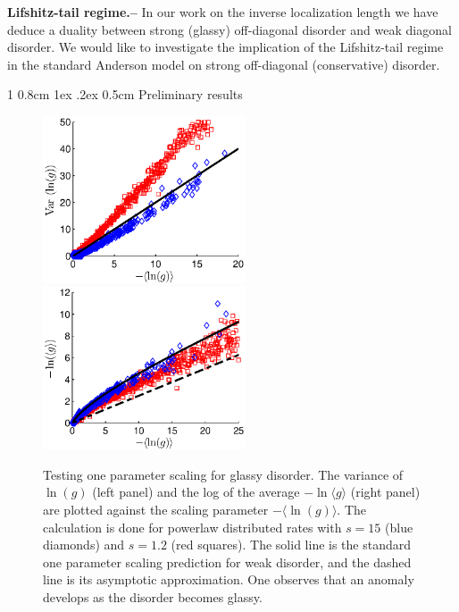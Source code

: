 \documentclass[onecolumn,fleqn,notitlepage,secnumarabic]{revtex4}
\makeatletter
\newcommand{\sect}[1]{{\bf #1.-- }}
\def\section{%
  \@startsection
    {section}%
    {1}%
    {\z@}%
    {0.8cm \@plus1ex \@minus .2ex}%
    {0.5cm}%
    {\Large\bf }%
}%
\makeatother
\begin{document}
\sect{Lifshitz-tail regime} In our work on the inverse localization length we have deduce a duality between strong (glassy) off-diagonal disorder and weak diagonal disorder. We would like to investigate the implication of the
Lifshitz-tail regime in the standard Anderson model on strong off-diagonal (conservative) disorder.
\newpage
\section{Preliminary results} \label{sec:prelim}
\begin{figure}[h]

\includegraphics[clip,width=6cm]{varVSavg}
\includegraphics[clip,width=6cm]{avgVSavg}

\caption{ \footnotesize 
Testing one parameter scaling for glassy disorder. 
The variance of $\ln(g)$ (left panel) and the log of the average $-\ln\langle g \rangle$ (right panel)
are plotted against the scaling parameter $-\langle \ln(g) \rangle$. 
The calculation is done for powerlaw distributed rates 
with ${s=15}$ (blue diamonds) and ${s=1.2}$ (red squares).
The solid line is the standard one parameter scaling prediction for weak disorder, 
and the dashed line is its asymptotic approximation. 
One observes that an anomaly develops as the disorder becomes glassy.}

\label{fig:scaling}
\end{figure}
\end{document}
